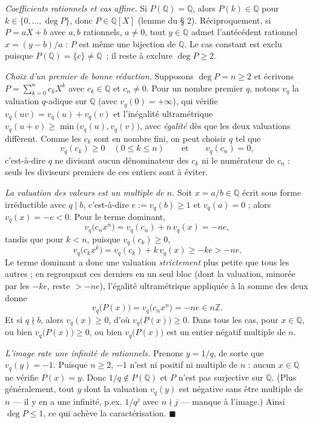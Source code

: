 
\begin{mdframed}[style=proofbar]
  \textit{Coefficients rationnels et cas affine.}\enspace
  Si $P(\mathbb{Q}) = \mathbb{Q}$, alors $P(k) \in \mathbb{Q}$ pour
  $k \in \{0,\ldots,\deg P\}$, donc $P \in \mathbb{Q}[X]$ (lemme du § 2).
  Réciproquement, si $P = aX + b$ avec $a,b$ rationnels, $a \neq 0$, tout
  $y \in \mathbb{Q}$ admet l'antécédent rationnel $x = (y-b)/a$ : $P$ est même
  une bijection de $\mathbb{Q}$. Le cas constant est exclu puisque
  $P(\mathbb{Q}) = \{c\} \neq \mathbb{Q}$~; il reste à exclure $\deg P \geq 2$.

  \smallskip\noindent
  \textit{Choix d'un premier de bonne réduction.}\enspace
  Supposons $\deg P = n \geq 2$ et écrivons $P = \sum_{k=0}^{n} c_k X^k$ avec
  $c_k \in \mathbb{Q}$ et $c_n \neq 0$. Pour un nombre premier $q$, notons $v_q$
  la valuation $q$-adique sur $\mathbb{Q}$ (avec $v_q(0) = +\infty$), qui vérifie
  $v_q(uv) = v_q(u) + v_q(v)$ et l'inégalité ultramétrique
  $v_q(u+v) \geq \min\bigl(v_q(u), v_q(v)\bigr)$, avec \emph{égalité} dès que les
  deux valuations diffèrent. Comme les $c_k$ sont en nombre fini, on peut choisir
  $q$ tel que
  \[
    v_q(c_k) \geq 0 \quad (0 \leq k \leq n)
    \qquad\text{et}\qquad
    v_q(c_n) = 0 ,
  \]
  c'est-à-dire $q$ ne divisant aucun dénominateur des $c_k$ ni le numérateur de
  $c_n$ : seuls les diviseurs premiers de ces entiers sont à éviter.

  \smallskip\noindent
  \textit{La valuation des valeurs est un multiple de $n$.}\enspace
  Soit $x = a/b \in \mathbb{Q}$ écrit sous forme irréductible avec $q \mid b$,
  c'est-à-dire $e := v_q(b) \geq 1$ et $v_q(a) = 0$ ; alors $v_q(x) = -e < 0$.
  Pour le terme dominant,
  \[
    v_q\bigl(c_n x^n\bigr) = v_q(c_n) + n\,v_q(x) = -ne ,
  \]
  tandis que pour $k < n$, puisque $v_q(c_k) \geq 0$,
  \[
    v_q\bigl(c_k x^k\bigr) = v_q(c_k) + k\,v_q(x) \geq -ke > -ne .
  \]
  Le terme dominant a donc une valuation \emph{strictement} plus petite que tous
  les autres ; en regroupant ces derniers en un seul bloc (dont la valuation,
  minorée par les $-ke$, reste $>-ne$), l'égalité ultramétrique appliquée à la
  somme des deux donne
  \[
    v_q\bigl(P(x)\bigr) = v_q\bigl(c_n x^n\bigr) = -ne \in n\mathbb{Z}.
  \]
  Et si $q \nmid b$, alors $v_q(x) \geq 0$, d'où $v_q\bigl(P(x)\bigr) \geq 0$.
  Dans tous les cas, pour $x \in \mathbb{Q}$, ou bien $v_q\bigl(P(x)\bigr) \geq 0$,
  ou bien $v_q\bigl(P(x)\bigr)$ est un entier négatif multiple de $n$.

  \smallskip\noindent
  \textit{L'image rate une infinité de rationnels.}\enspace
  Prenons $y = 1/q$, de sorte que $v_q(y) = -1$. Puisque $n \geq 2$, $-1$ n'est
  ni positif ni multiple de $n$ : aucun $x \in \mathbb{Q}$ ne vérifie
  $P(x) = y$. Donc $1/q \notin P(\mathbb{Q})$ et $P$ n'est pas surjective sur
  $\mathbb{Q}$. (Plus généralement, tout $y$ dont la valuation $v_q(y)$ est
  négative sans être multiple de $n$ — il y en a une infinité, p.ex. $1/q^j$
  avec $n \nmid j$ — manque à l'image.) Ainsi
  $\deg P \leq 1$, ce qui achève la caractérisation.
  \hfill$\blacksquare$
\end{mdframed}

